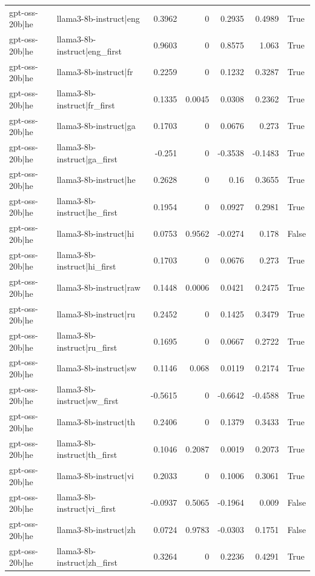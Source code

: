 \begin{table}
\begin{tabular}{l l r r r r l}
gpt-oss-20b|he & llama3-8b-instruct|eng & 0.3962 & 0 & 0.2935 & 0.4989 & True \\
gpt-oss-20b|he & llama3-8b-instruct|eng_first & 0.9603 & 0 & 0.8575 & 1.063 & True \\
gpt-oss-20b|he & llama3-8b-instruct|fr & 0.2259 & 0 & 0.1232 & 0.3287 & True \\
gpt-oss-20b|he & llama3-8b-instruct|fr_first & 0.1335 & 0.0045 & 0.0308 & 0.2362 & True \\
gpt-oss-20b|he & llama3-8b-instruct|ga & 0.1703 & 0 & 0.0676 & 0.273 & True \\
gpt-oss-20b|he & llama3-8b-instruct|ga_first & -0.251 & 0 & -0.3538 & -0.1483 & True \\
gpt-oss-20b|he & llama3-8b-instruct|he & 0.2628 & 0 & 0.16 & 0.3655 & True \\
gpt-oss-20b|he & llama3-8b-instruct|he_first & 0.1954 & 0 & 0.0927 & 0.2981 & True \\
gpt-oss-20b|he & llama3-8b-instruct|hi & 0.0753 & 0.9562 & -0.0274 & 0.178 & False \\
gpt-oss-20b|he & llama3-8b-instruct|hi_first & 0.1703 & 0 & 0.0676 & 0.273 & True \\
gpt-oss-20b|he & llama3-8b-instruct|raw & 0.1448 & 0.0006 & 0.0421 & 0.2475 & True \\
gpt-oss-20b|he & llama3-8b-instruct|ru & 0.2452 & 0 & 0.1425 & 0.3479 & True \\
gpt-oss-20b|he & llama3-8b-instruct|ru_first & 0.1695 & 0 & 0.0667 & 0.2722 & True \\
gpt-oss-20b|he & llama3-8b-instruct|sw & 0.1146 & 0.068 & 0.0119 & 0.2174 & True \\
gpt-oss-20b|he & llama3-8b-instruct|sw_first & -0.5615 & 0 & -0.6642 & -0.4588 & True \\
gpt-oss-20b|he & llama3-8b-instruct|th & 0.2406 & 0 & 0.1379 & 0.3433 & True \\
gpt-oss-20b|he & llama3-8b-instruct|th_first & 0.1046 & 0.2087 & 0.0019 & 0.2073 & True \\
gpt-oss-20b|he & llama3-8b-instruct|vi & 0.2033 & 0 & 0.1006 & 0.3061 & True \\
gpt-oss-20b|he & llama3-8b-instruct|vi_first & -0.0937 & 0.5065 & -0.1964 & 0.009 & False \\
gpt-oss-20b|he & llama3-8b-instruct|zh & 0.0724 & 0.9783 & -0.0303 & 0.1751 & False \\
gpt-oss-20b|he & llama3-8b-instruct|zh_first & 0.3264 & 0 & 0.2236 & 0.4291 & True \\

\end{tabular}
\end{table}
